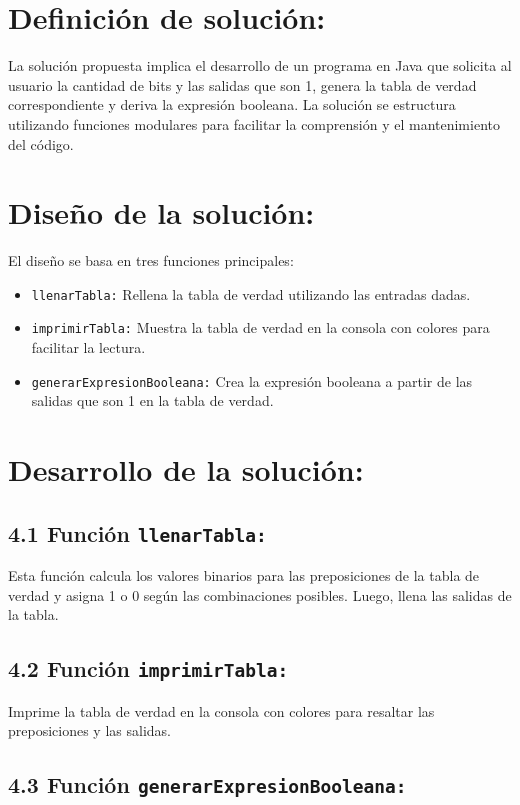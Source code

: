 \documentclass{IEEEcsmag}
\begin{document}
\section*{Definición de solución:}

La solución propuesta implica el desarrollo de un programa en Java que solicita al usuario la cantidad de bits y las salidas que son 1, genera la tabla de verdad correspondiente y deriva la expresión booleana. La solución se estructura utilizando funciones modulares para facilitar la comprensión y el mantenimiento del código.

\section*{Diseño de la solución:}

El diseño se basa en tres funciones principales:
\begin{itemize}
    \item \texttt{llenarTabla:} Rellena la tabla de verdad utilizando las entradas dadas.
    \item \texttt{imprimirTabla:} Muestra la tabla de verdad en la consola con colores para facilitar la lectura.
    \item \texttt{generarExpresionBooleana:} Crea la expresión booleana a partir de las salidas que son 1 en la tabla de verdad.
\end{itemize}

\section*{Desarrollo de la solución:}

\subsection*{4.1 Función \texttt{llenarTabla:}}

Esta función calcula los valores binarios para las preposiciones de la tabla de verdad y asigna 1 o 0 según las combinaciones posibles. Luego, llena las salidas de la tabla.

\subsection*{4.2 Función \texttt{imprimirTabla:}}

Imprime la tabla de verdad en la consola con colores para resaltar las preposiciones y las salidas.

\subsection*{4.3 Función \texttt{generarExpresionBooleana:}}
\end{document}
